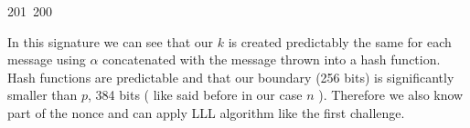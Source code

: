 201~200~\documentclass{article}
\begin{document}
	                                                                        	                                                                    	                                	                    	                    	                        	                        	                    	                                                                	                	                                                                    	                    							                                                                                                                                                                                                    		                                                                                                                        				    			                                                                    In this signature we can see that our $k$ is created predictably the same for each message using $\alpha$ concatenated with the message thrown into a hash function. 
	                                                                        	                                                                    	                                	                    	                    	                        	                        	                    	                                                                	                	                                                                    	                    							                                                                                                                                                                                                    		                                                                                                                        				    			                                                                    Hash functions are predictable and that our boundary (256 bits) is significantly smaller than $p$, 384 bits ( like said before in our case $n$ ). Therefore we also know part of the nonce and can apply LLL algorithm like the first challenge.
\end{document}
